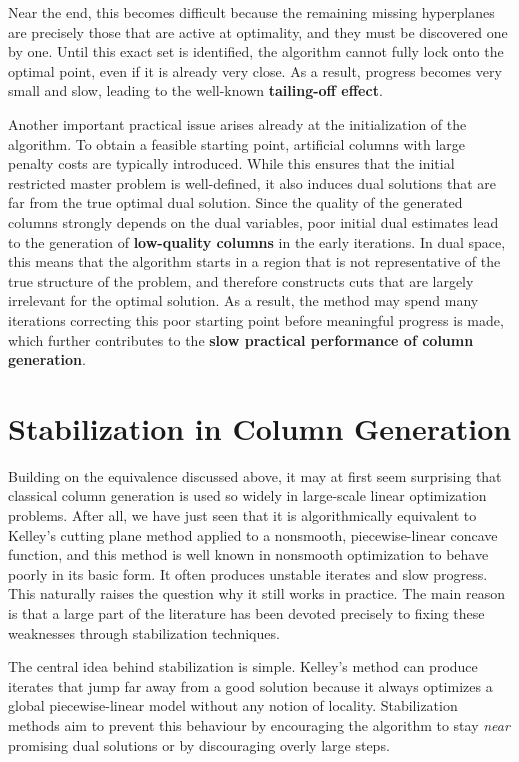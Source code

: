 \documentclass{book}
\theoremstyle{definition}
\newcounter{algorithm_}
\numberwithin{algorithm_}{chapter}
\begin{document}
Near the end, this becomes difficult because the remaining missing hyperplanes are precisely those that are active at optimality, and they must be discovered one by one. Until this exact set is identified, the algorithm cannot fully lock onto the optimal point, even if it is already very close. As a result, progress becomes very small and slow, leading to the well-known \textbf{tailing-off effect}.

\bigskip

Another important practical issue arises already at the initialization of the algorithm. To obtain a feasible starting point, artificial columns with large penalty costs are typically introduced. While this ensures that the initial restricted master problem is well-defined, it also induces dual solutions that are far from the true optimal dual solution. Since the quality of the generated columns strongly depends on the dual variables, poor initial dual estimates lead to the generation of \textbf{low-quality columns} in the early iterations. In dual space, this means that the algorithm starts in a region that is not representative of the true structure of the problem, and therefore constructs cuts that are largely irrelevant for the optimal solution. As a result, the method may spend many iterations correcting this poor starting point before meaningful progress is made, which further contributes to the \textbf{slow practical performance of column generation}.


\section{Stabilization in Column Generation}

Building on the equivalence discussed above, it may at first seem surprising that classical column generation is used so widely in large-scale linear optimization problems. After all, we have just seen that it is algorithmically equivalent to Kelley's cutting plane method applied to a nonsmooth, piecewise-linear concave function, and this method is well known in nonsmooth optimization to behave poorly in its basic form. It often produces unstable iterates and slow progress. This naturally raises the question why it still works in practice. The main reason is that a large part of the literature has been devoted precisely to fixing these weaknesses through stabilization techniques.

\bigskip

The central idea behind stabilization is simple. Kelley's method can produce iterates that jump far away from a good solution because it always optimizes a global piecewise-linear model without any notion of locality. Stabilization methods aim to prevent this behaviour by encouraging the algorithm to stay \textit{near} promising dual solutions or by discouraging overly large steps.
\end{document}
